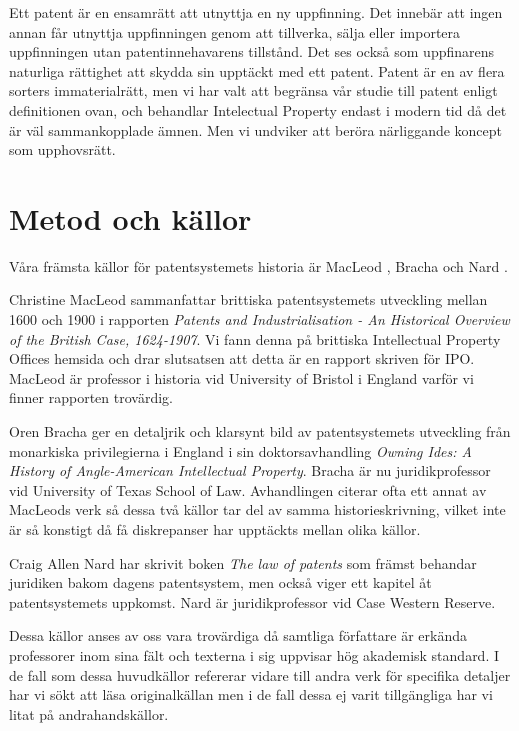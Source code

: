  
 Ett patent är en ensamrätt att utnyttja en ny uppfinning. Det innebär att ingen
 annan får utnyttja uppfinningen genom att tillverka, sälja eller importera 
 uppfinningen utan patentinnehavarens tillstånd. Det ses också som uppfinarens naturliga rättighet att skydda sin upptäckt med ett patent. Patent är en av flera sorters
 immaterialrätt, men vi har valt att begränsa vår studie till patent enligt
 definitionen ovan, och behandlar Intelectual Property endast i modern tid då det är väl sammankopplade ämnen. Men vi undviker att beröra närliggande koncept som upphovsrätt.

\section{Metod och källor}

Våra främsta källor för patentsystemets historia är MacLeod \cite{macleod},
Bracha \cite{bracha} och Nard \cite{nard}.

Christine MacLeod sammanfattar brittiska patentsystemets utveckling mellan 
1600 och 1900 i rapporten \emph{Patents and Industrialisation - An Historical 
Overview of the British Case, 1624-1907}. Vi fann denna på brittiska 
Intellectual Property Offices hemsida och drar slutsatsen att detta är en 
rapport skriven för IPO. MacLeod är professor i historia vid University of 
Bristol i England varför vi finner rapporten trovärdig.

Oren Bracha ger en detaljrik och klarsynt bild av patentsystemets utveckling 
från monarkiska privilegierna i England i sin doktorsavhandling \emph{Owning 
Ides: A History of Angle-American Intellectual Property}. Bracha är nu 
juridikprofessor vid University of Texas School of Law. Avhandlingen citerar 
ofta ett annat av MacLeods verk så dessa två källor tar del av samma 
historieskrivning, vilket inte är så konstigt då få diskrepanser har upptäckts 
mellan olika källor.

Craig Allen Nard har skrivit boken \emph{The law of patents} som främst 
behandar juridiken bakom dagens patentsystem, men också viger ett kapitel åt 
patentsystemets uppkomst. Nard är juridikprofessor vid Case Western Reserve.

Dessa källor anses av oss vara trovärdiga då samtliga författare är erkända 
professorer inom sina fält och texterna i sig uppvisar hög akademisk standard. 
I de fall som dessa huvudkällor refererar vidare till andra verk för 
specifika detaljer har vi sökt att läsa originalkällan men i de fall dessa ej 
varit tillgängliga har vi litat på andrahandskällor.

